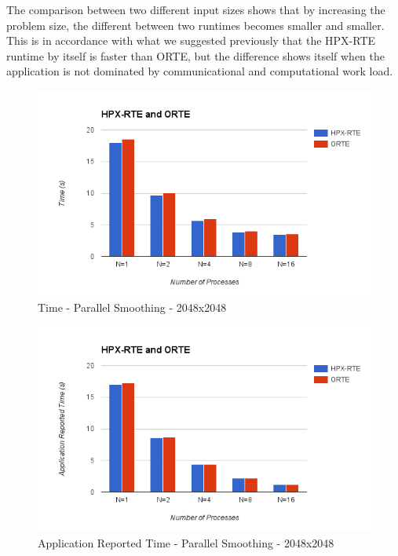 The comparison between two different input sizes shows that by increasing the problem size, the different between two runtimes becomes smaller and smaller. This is in accordance with what we suggested previously that the HPX-RTE runtime by itself is faster than ORTE, but the difference shows itself when the application is not dominated by communicational and computational work load.

\begin{figure}[h!]
  \centering
  \includegraphics[scale=0.7]{images/time-all-smoother-2048-infiniband.png}
  \caption[Time - Parallel Smoothing - 2048x2048]{Time - Parallel Smoothing - 2048x2048}
  \label{fig:time-all-smoother-2048-infiniband}
\end{figure}

\begin{figure}[h!]
  \centering
  \includegraphics[scale=0.7]{images/time-app-smoother-2048-infiniband.png}
  \caption[Application Reported Time - Parallel Smoothing - 2048x2048]{Application Reported Time - Parallel Smoothing - 2048x2048}
  \label{fig:time-app-smoother-2048-infiniband}
\end{figure}

